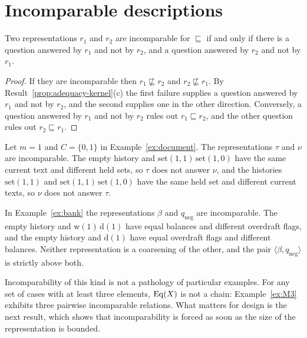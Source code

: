 \section{Incomparable descriptions}

\begin{established}\label{prop:no-best}
Two representations $r_1$ and $r_2$ are incomparable for $\sqsubseteq$ if and only if there is a question answered by $r_1$ and not by $r_2$, and a question answered by $r_2$ and not by $r_1$.
\end{established}
\begin{proof}
If they are incomparable then $r_1\not\sqsubseteq r_2$ and $r_2\not\sqsubseteq r_1$. By Result~\ref{prop:adequacy-kernel}(c) the first failure supplies a question answered by $r_1$ and not by $r_2$, and the second supplies one in the other direction. Conversely, a question answered by $r_1$ and not by $r_2$ rules out $r_1\sqsubseteq r_2$, and the other question rules out $r_2\sqsubseteq r_1$.
\end{proof}

\begin{example}\label{ex:doc-incomparable}
Let $m=1$ and $C=\{0,1\}$ in Example~\ref{ex:document}. The representations $\tau$ and $\nu$ are incomparable. The empty history and $\mathrm{set}(1,1)\,\mathrm{set}(1,0)$ have the same current text and different held sets, so $\tau$ does not answer $\nu$, and the histories $\mathrm{set}(1,1)$ and $\mathrm{set}(1,1)\,\mathrm{set}(1,0)$ have the same held set and different current texts, so $\nu$ does not answer $\tau$.
\end{example}

\begin{example}\label{ex:bank-incomparable}
In Example~\ref{ex:bank} the representations $\beta$ and $q_{\mathrm{neg}}$ are incomparable. The empty history and $\mathrm{w}(1)\,\mathrm{d}(1)$ have equal balances and different overdraft flags, and the empty history and $\mathrm{d}(1)$ have equal overdraft flags and different balances. Neither representation is a coarsening of the other, and the pair $\langle\beta,q_{\mathrm{neg}}\rangle$ is strictly above both.
\end{example}

Incomparability of this kind is not a pathology of particular examples. For any set of cases with at least three elements, $\operatorname{Eq}(X)$ is not a chain: Example~\ref{ex:M3} exhibits three pairwise incomparable relations. What matters for design is the next result, which shows that incomparability is forced as soon as the size of the representation is bounded.

